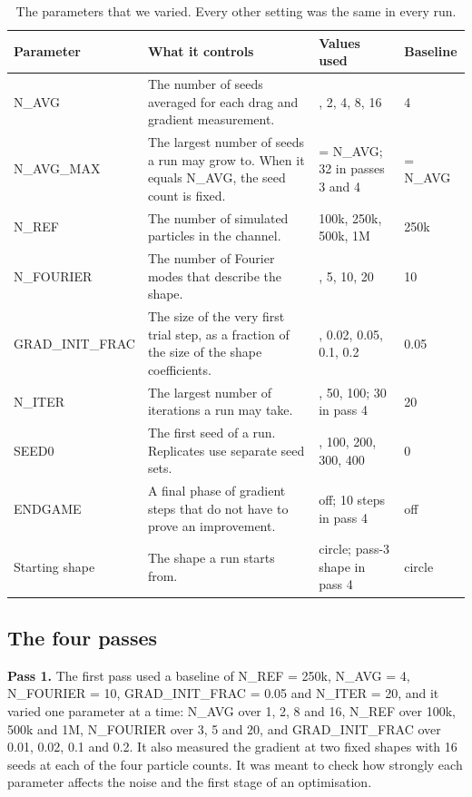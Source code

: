 \documentclass[10pt]{article}
\begin{document}
\begin{table}[H]
\centering
\small
\caption{\label{tab:varied}The parameters that we varied. Every other setting was the same in every run.}
\begin{tabular}{l>{\raggedright\arraybackslash}p{6.6cm}>{\raggedright\arraybackslash}p{3.8cm}l}
\toprule
Parameter & What it controls & Values used & Baseline \\
\midrule
N\_AVG & The number of seeds averaged for each drag and gradient measurement. & 1, 2, 4, 8, 16 & 4 \\
N\_AVG\_MAX & The largest number of seeds a run may grow to. When it equals N\_AVG, the seed count is fixed. & = N\_AVG; 32 in passes 3 and 4 & = N\_AVG \\
N\_REF & The number of simulated particles in the channel. & 100k, 250k, 500k, 1M & 250k \\
N\_FOURIER & The number of Fourier modes that describe the shape. & 3, 5, 10, 20 & 10 \\
GRAD\_INIT\_FRAC & The size of the very first trial step, as a fraction of the size of the shape coefficients. & 0.01, 0.02, 0.05, 0.1, 0.2 & 0.05 \\
N\_ITER & The largest number of iterations a run may take. & 20, 50, 100; 30 in pass 4 & 20 \\
SEED0 & The first seed of a run. Replicates use separate seed sets. & 0, 100, 200, 300, 400 & 0 \\
ENDGAME & A final phase of gradient steps that do not have to prove an improvement. & off; 10 steps in pass 4 & off \\
Starting shape & The shape a run starts from. & circle; pass-3 shape in pass 4 & circle \\
\bottomrule
\end{tabular}
\end{table}


\subsection{The four passes}
\textbf{Pass 1.} The first pass used a baseline of N\_REF = 250k, N\_AVG = 4, N\_FOURIER = 10, GRAD\_INIT\_FRAC = 0.05 and N\_ITER = 20, and it varied one parameter at a time: N\_AVG over 1, 2, 8 and 16, N\_REF over 100k, 500k and 1M, N\_FOURIER over 3, 5 and 20, and GRAD\_INIT\_FRAC over 0.01, 0.02, 0.1 and 0.2.
It also measured the gradient at two fixed shapes with 16 seeds at each of the four particle counts.
It was meant to check how strongly each parameter affects the noise and the first stage of an optimisation.
\end{document}
